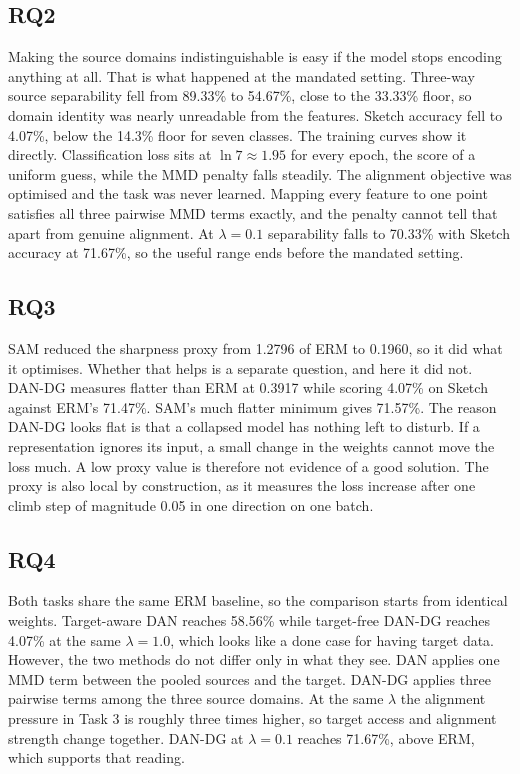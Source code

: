 \documentclass{article}
\begin{document}
\subsection{RQ2}

Making the source domains indistinguishable is easy if the model stops
encoding anything at all. That is what happened at the mandated setting.
Three-way source separability fell from 89.33\% to 54.67\%, close to the
33.33\% floor, so domain identity was nearly unreadable from the features.
Sketch accuracy fell to 4.07\%, below the 14.3\% floor for seven classes. The
training curves show it directly. Classification loss sits at
$\ln 7 \approx 1.95$ for every epoch, the score of a uniform guess, while the
MMD penalty falls steadily. The alignment objective was optimised and the
task was never learned. Mapping every feature to one point satisfies all
three pairwise MMD terms exactly, and the penalty cannot tell that apart from
genuine alignment. At $\lambda = 0.1$ separability falls to 70.33\% with
Sketch accuracy at 71.67\%, so the useful range ends before the mandated
setting.

\subsection{RQ3}

SAM reduced the sharpness proxy from 1.2796 of ERM to 0.1960, so it did what
it optimises. Whether that helps is a separate question, and here it did not.
DAN-DG measures flatter than ERM at 0.3917 while scoring 4.07\% on Sketch
against ERM's 71.47\%. SAM's much flatter minimum gives 71.57\%. The reason
DAN-DG looks flat is that a collapsed model has nothing left to disturb. If a
representation ignores its input, a small change in the weights cannot move
the loss much. A low proxy value is therefore not evidence of a good
solution. The proxy is also local by construction, as it measures the loss
increase after one climb step of magnitude 0.05 in one direction on one
batch.

\subsection{RQ4}

Both tasks share the same ERM baseline, so the comparison starts from
identical weights. Target-aware DAN reaches 58.56\% while target-free DAN-DG
reaches 4.07\% at the same $\lambda = 1.0$, which looks like a done case for
having target data. However, the two methods do not differ only in what they
see. DAN applies one MMD term between the pooled sources and the target.
DAN-DG applies three pairwise terms among the three source domains. At the
same $\lambda$ the alignment pressure in Task 3 is roughly three times
higher, so target access and alignment strength change together. DAN-DG at
$\lambda = 0.1$ reaches 71.67\%, above ERM, which supports that reading.
\end{document}
